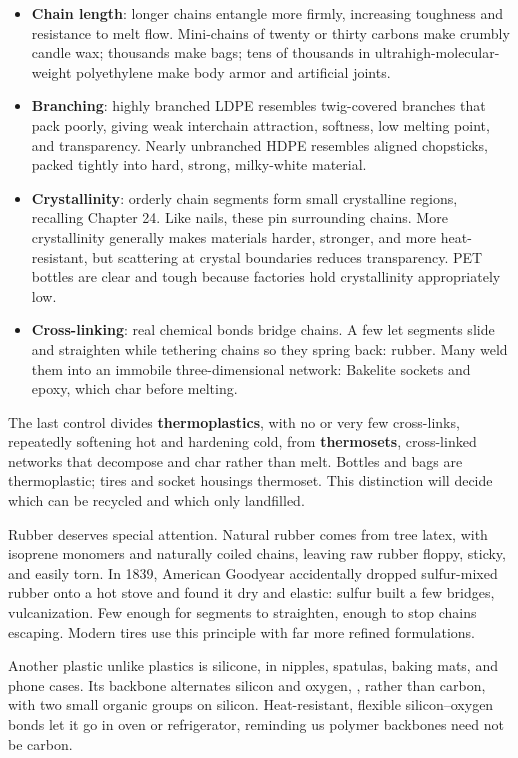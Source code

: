 \begin{itemize}[itemsep=2pt]
\item \textbf{Chain length}: longer chains entangle more firmly, increasing toughness and resistance to melt flow. Mini-chains of twenty or thirty carbons make crumbly candle wax; thousands make bags; tens of thousands in ultrahigh-molecular-weight polyethylene make body armor and artificial joints.
\item \textbf{Branching}: highly branched LDPE resembles twig-covered branches that pack poorly, giving weak interchain attraction, softness, low melting point, and transparency. Nearly unbranched HDPE resembles aligned chopsticks, packed tightly into hard, strong, milky-white material.
\item \textbf{Crystallinity}: orderly chain segments form small crystalline regions, recalling Chapter 24. Like nails, these pin surrounding chains. More crystallinity generally makes materials harder, stronger, and more heat-resistant, but scattering at crystal boundaries reduces transparency. PET bottles are clear and tough because factories hold crystallinity appropriately low.
\item \textbf{Cross-linking}: real chemical bonds bridge chains. A few let segments slide and straighten while tethering chains so they spring back: rubber. Many weld them into an immobile three-dimensional network: Bakelite sockets and epoxy, which char before melting.
\end{itemize}

The last control divides \textbf{thermoplastics}, with no or very few cross-links, repeatedly softening hot and hardening cold, from \textbf{thermosets}, cross-linked networks that decompose and char rather than melt. Bottles and bags are thermoplastic; tires and socket housings thermoset. This distinction will decide which can be recycled and which only landfilled.

Rubber deserves special attention. Natural rubber comes from tree latex, with isoprene monomers and naturally coiled chains, leaving raw rubber floppy, sticky, and easily torn. In 1839, American Goodyear accidentally dropped sulfur-mixed rubber onto a hot stove and found it dry and elastic: sulfur built a few bridges, vulcanization. Few enough for segments to straighten, enough to stop chains escaping. Modern tires use this principle with far more refined formulations.

Another plastic unlike plastics is silicone, in nipples, spatulas, baking mats, and phone cases. Its backbone alternates silicon and oxygen, , rather than carbon, with two small organic groups on silicon. Heat-resistant, flexible silicon--oxygen bonds let it go in oven or refrigerator, reminding us polymer backbones need not be carbon.

